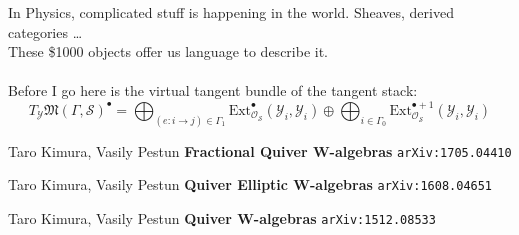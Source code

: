 \documentclass[12pt]{article}
\begin{document}
In Physics, complicated stuff is happening in the world.  Sheaves, derived categories \dots \\ These \$1000 objects offer us language to describe it.  \\ \\
Before I go here is the virtual tangent bundle of the tangent stack:
$$ T_\mathcal{Y}\mathfrak{M}(\Gamma, \mathcal{S})^\bullet = \bigoplus_{(e:i\to j)\in \Gamma_1} \text{Ext}_{\mathcal{O}_\mathcal{S}}^\bullet (\mathcal{Y}_i, \mathcal{Y}_i) \oplus \bigoplus_{i \in \Gamma_0} \text{Ext}_{\mathcal{O}_\mathcal{S}}^{\bullet + 1}(\mathcal{Y}_i, \mathcal{Y}_i) $$
\vfill

\begin{thebibliography}{}

\item Taro Kimura, Vasily Pestun \textbf{Fractional Quiver W-algebras} \texttt{arXiv:1705.04410}

\item Taro Kimura, Vasily Pestun \textbf{Quiver Elliptic W-algebras} \texttt{arXiv:1608.04651}

\item Taro Kimura, Vasily Pestun \textbf{Quiver W-algebras} \texttt{arXiv:1512.08533}






\end{thebibliography}
\end{document}
